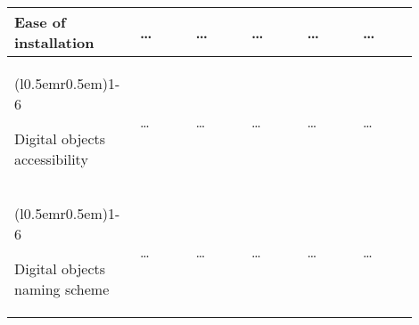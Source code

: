 \begin{longtable}{p{0.25\linewidth} p{0.13\linewidth} p{0.13\linewidth}
p{0.13\linewidth} p{0.13\linewidth} p{0.13\linewidth}}
 {Ease of installation}&
 {\ldots}&
 {\ldots}&
 {\ldots}&
 {\ldots}&
 {\ldots}\\

 \cmidrule[0.1pt](l{0.5em}r{0.5em}){1-6}

 {Digital objects accessibility}&
 {\ldots}&
 {\ldots}&
 {\ldots}&
 {\ldots}&
 {\ldots}\\

 \cmidrule[0.1pt](l{0.5em}r{0.5em}){1-6}

 {Digital objects naming scheme}&
 {\ldots}&
 {\ldots}&
 {\ldots}&
 {\ldots}&
 {\ldots}\\

 \end{longtable}
